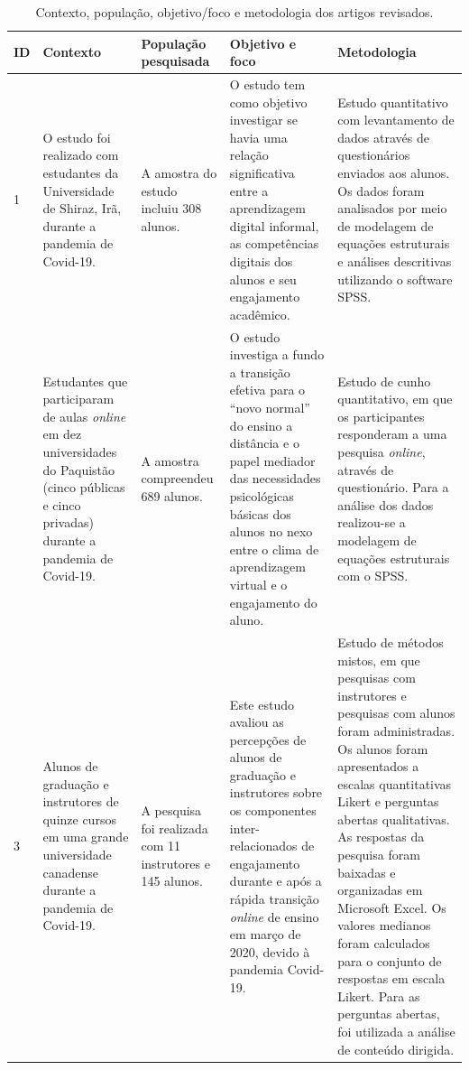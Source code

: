 \documentclass[portuguese]{textolivre}
\begin{document}
\begin{small}
\begin{longtable}{p{}p{}p{}p{}p{}
    }
\caption{Contexto, população, objetivo/foco e metodologia dos artigos revisados.}
\label{tab4}
\\
\toprule
ID & Contexto & População pesquisada & Objetivo e foco & Metodologia
\\
\midrule
1 & O estudo foi realizado com estudantes da Universidade de Shiraz, Irã, durante a pandemia de Covid-19. & A amostra do estudo incluiu 308 alunos. & O estudo tem como objetivo investigar se havia uma relação significativa entre a aprendizagem digital informal, as competências digitais dos alunos e seu engajamento acadêmico. & Estudo quantitativo com levantamento de dados através de questionários enviados aos alunos. Os dados foram analisados por meio de modelagem de equações estruturais e análises descritivas utilizando o software SPSS.
\\
\arrayrulecolor{gray}
\midrule
2 & Estudantes que participaram de aulas \textit{online} em dez universidades  do Paquistão (cinco públicas e cinco privadas) durante a pandemia de Covid-19. & A amostra compreendeu 689 alunos. & O estudo investiga a fundo a transição efetiva para o “novo normal” do ensino a distância e o papel mediador das necessidades psicológicas básicas dos alunos no nexo entre o clima de aprendizagem virtual e o engajamento do aluno. & Estudo de cunho quantitativo, em que os participantes responderam a uma pesquisa \textit{online}, através de questionário. Para a análise dos dados realizou-se a modelagem de equações estruturais com o SPSS.
\\
\midrule
3 & Alunos de graduação e instrutores de quinze cursos em uma grande universidade canadense durante a pandemia de Covid-19. & A pesquisa foi realizada com 11 instrutores e 145 alunos. & Este estudo avaliou as percepções de alunos de graduação e instrutores sobre os componentes inter-relacionados de engajamento durante e após a rápida transição \textit{online} de ensino em março de 2020, devido à pandemia Covid-19. & Estudo de métodos mistos, em que pesquisas com instrutores e pesquisas com alunos foram administradas. Os alunos foram apresentados a escalas quantitativas Likert e perguntas abertas qualitativas. As respostas da pesquisa foram baixadas e organizadas em Microsoft Excel.
Os valores medianos foram calculados para o conjunto de respostas em escala Likert.
Para as perguntas abertas, foi utilizada a análise de conteúdo dirigida.

\end{longtable}
\end{small}
\end{document}
